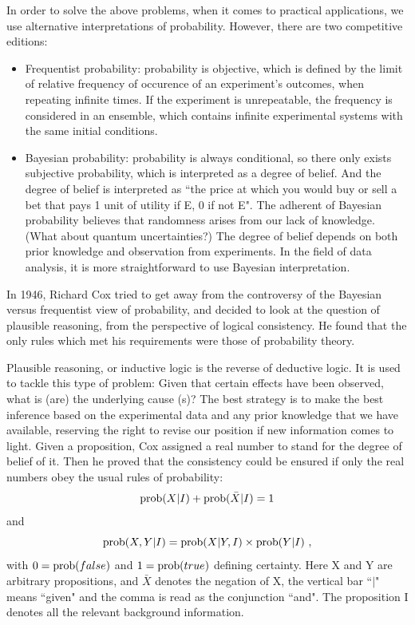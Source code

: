 \documentclass[11pt, a4paper]{article}
\begin{document}
In order to solve the above problems, when it comes to practical applications, we use alternative interpretations of probability. However, there are two competitive editions:
\begin{itemize}
\item Frequentist probability: probability is objective, which is defined by the limit of relative frequency of occurence of an experiment's outcomes, when repeating infinite times. If the experiment is unrepeatable, the frequency is considered in an ensemble, which contains infinite experimental systems with the same initial conditions.
\item Bayesian probability: probability is always conditional, so there only exists subjective probability, which is interpreted as a degree of belief. And the degree of belief is interpreted as ``the price at which you would buy or sell a bet that pays 1 unit of utility if E, 0 if not E". The adherent of Bayesian probability believes that randomness arises from our lack of knowledge. (What about quantum uncertainties?)  The degree of belief depends on both prior knowledge and observation from experiments. In the field of data analysis, it is more straightforward to use Bayesian interpretation.
\end{itemize}

In 1946, Richard Cox tried to get away from the controversy of the Bayesian versus frequentist view of probability, and decided to look at the question of plausible reasoning, from the perspective of logical consistency. He found that the only rules which met his requirements were those of probability theory.

Plausible reasoning, or inductive logic is the reverse of deductive logic. It is used to tackle this type of problem: Given that certain effects have been observed, what is (are) the underlying cause (s)? The best strategy is to make the best inference based on the experimental data and any prior knowledge that we have available, reserving the right to revise our position if new information comes to light. Given a proposition, Cox assigned a real number to stand for the degree of belief of it. Then he proved that the consistency could be ensured if only the real numbers obey the usual rules of probability:
\begin{equation}\label{axiom1}
{\rm prob}(X|I)+{\rm prob}(\bar X|I)=1
\end{equation}
and
\begin{equation}\label{axiom2}
{\rm prob}(X,Y|I)={\rm prob}(X|Y,I)\times {\rm prob}(Y|I)~,
\end{equation}
with $0={\rm prob}(false)$ and $1={\rm prob}(true)$ defining certainty. Here X and Y are arbitrary propositions, and $\bar X$ denotes the negation of X, the vertical bar ``$|$" means ``given" and the comma is read as the conjunction ``and". The proposition I denotes all the relevant background information.
\end{document}
